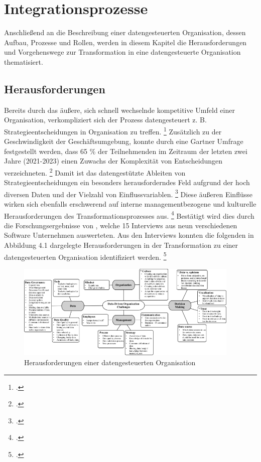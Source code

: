 \chapter[Integrationsprozesse]{Integrationsprozesse}

Anschließend an die Beschreibung einer datengesteuerten Organisation, dessen Aufbau, Prozesse und Rollen, werden in diesem Kapitel die Herausforderungen und Vorgehenswege zur Transformation in eine datengesteuerte Organisation thematisiert.

\section{Herausforderungen}

Bereits durch das äußere, sich schnell wechselnde kompetitive Umfeld einer Organisation, verkompliziert sich der Prozess datengesteuert z. B. Strategieentscheidungen in Organisation zu treffen. \footcite[Vgl.][S. 2]{Pratt.2023} 
Zusätzlich zu der Geschwindigkeit der Geschäftsumgebung, konnte durch eine Gartner Umfrage festgestellt werden, dass 65 \% der Teilnehmenden im Zeitraum der letzten zwei Jahre (2021-2023) einen Zuwachs der Komplexität von Entscheidungen verzeichneten. \footcite[Vgl.][S. 65]{Pratt.2023}
Damit ist das datengestützte Ableiten von Strategieentscheidungen ein besonders herausforderndes Feld aufgrund der hoch diversen Daten und der Vielzahl von Einflussvariablen. \footcite[Vgl.][S. 3]{Pratt.2023}
Diese äußeren Einflüsse wirken sich ebenfalls erschwerend auf interne managementbezogene und kulturelle Herausforderungen des Transformationsprozesses aus. \footcite[Vgl.][S. 15]{Dalpiaz.2020}
Bestätigt wird dies durch die Forschungsergebnisse von , welche 15 Interviews aus neun verschiedenen Software Unternehmen auswerteten.
Aus den Interviews konnten die folgenden in Abbildung 4.1 dargelegte Herausforderungen in der Transformation zu einer datengesteuerten Organisation identifiziert werden. \footcite[][S. 9]{Dalpiaz.2020}

\begin{figure}[htb]
    \centering
    \includegraphics[width=0.95\textwidth]{graphics/DDO challenges.png}
    \caption{Herausforderungen einer datengesteuerten Organisation}
    \label{fig:DDOs challenges}
\end{figure}

